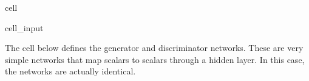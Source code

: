 \documentclass[letterpaper,10pt,english]{jupyterBook}
\begin{document}
\begin{sphinxuseclass}{cell}\begin{sphinxVerbatimInput}

\begin{sphinxuseclass}{cell_input}
\begin{sphinxVerbatim}[commandchars=\\\{\}]
  
  
\end{sphinxVerbatim}

\end{sphinxuseclass}\end{sphinxVerbatimInput}

\end{sphinxuseclass}
\sphinxAtStartPar
The cell below defines the generator and discriminator networks. These are very simple networks that map scalars to scalars through a hidden layer. In this case, the networks are actually identical.
\end{document}
